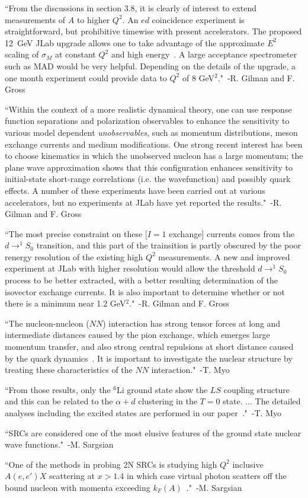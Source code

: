 ``From the discussions in section 3.8, it is clearly of interest to extend measurements of $A$ to higher $Q^2$. An $ed$ coincidence experiment is straightforward, but prohibitive timewise with present accelerators. The proposed 12~GeV JLab upgrade allows one to take advantage of the approximate $E^2$ scaling of $\sigma_M$ at constant $Q^2$ and high energy~\cite{Petratos:2002wz}. A large acceptance spectrometer such as MAD would be very helpful. Depending on the details of the upgrade, a one month experiment could provide data to $Q^2$ of 8 GeV$^2$."~-R. Gilman and F. Gross~\cite{Gilman:2001yh}

``Within the context of a more realistic dynamical theory, one can use response function separations and polarization observables to enhance the sensitivity to various model dependent \emph{unobservables}, such as momentum distributions, meson exchange currents and medium modifications. One strong recent interest has been to choose kinematics in which the unobserved nucleon has a large momentum; the plane wave approximation shows that this configuration enhances sensitivity to initial-state short-range correlations (i.e. the wavefunction) and possibly quark effects. A number of these experiments have been carried out at various accelerators, but no experiments at JLab have yet reported the results."~-R. Gilman and F. Gross~\cite{Gilman:2001yh}

``The most precise constraint on these [$I=1$ exchange] currents comes from the $d\rightarrow ^1S_0$ transition, and this part of the trainsition is partly obscured by the poor renergy resolution of the existing high $Q^2$ measurements. A new and improved experiment at JLab with higher resolution would allow the threshold $d\rightarrow ^1S_0$ process to be better extracted, with a better resulting determination of the isovector exchange currents. It is also important to determine whether or not there is a minimum near 1.2 GeV$^2$."~-R. Gilman and F. Gross~\cite{Gilman:2001yh}

``The nucleon-nucleon ($NN$) interaction has strong tensor forces at long and intermediate distances caused by the pion exchange, which emerges large momentum transfer, and also strong central repulsions at short distance caused by the quark dynamics~\cite{Pieper:2001mp,Kamada:2001tv}. It is important to investigate the nuclear structure by treating these characteristics of the $NN$ interaction."~-T. Myo~\cite{Myo:2013dya}

``From those results, only the $^6$Li ground state show the $LS$ coupling structure and this can be related to the $\alpha + d$ clustering in the $T=0$ state. ... The detailed analyses including the excited states are performed in our paper~\cite{Myo:2012pv}."~-T. Myo~\cite{Myo:2013dya}

``SRCs are considered one of the most elusive features of the ground state nuclear wave functions."~-M. Sargsian~\cite{Sargsian:2012gj}

``One of the methods in probing 2N SRCs is studying high $Q^2$ inclusive $A(e,e')X$ scattering at $x>1.4$ in which case virtual photon scatters off the bound nucleon with momenta exceeding $k_F(A)$~\cite{Sargsian:2001ax, Sargsian:2002wc}."~-M. Sargsian~\cite{Sargsian:2012gj}
